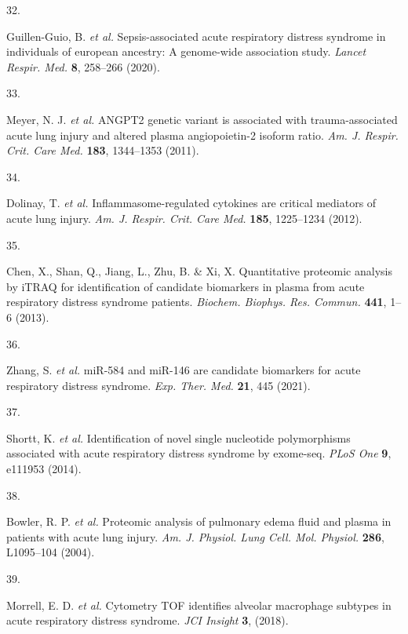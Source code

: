 \documentclass[
  11,
  a4paper,
]{article}
\newlength{\cslhangindent}
\newlength{\csllabelwidth}
\newlength{\cslentryspacingunit} %
\newenvironment{CSLReferences}[2] %
 {%
  \setlength{\parindent}{0pt}
  \ifodd #1
  \let\oldpar\par
  \def\par{\hangindent=\cslhangindent\oldpar}
  \fi
  \setlength{\parskip}{#2\cslentryspacingunit}
 }%
 {}
\newcommand{\CSLLeftMargin}[1]{\parbox[t]{\csllabelwidth}{#1}}
\newcommand{\CSLRightInline}[1]{\parbox[t]{\linewidth - \csllabelwidth}{#1}\break}
\begin{document}
\begin{CSLReferences}{0}{0}
\leavevmode{}%
\CSLLeftMargin{32. }%
\CSLRightInline{Guillen-Guio, B. \emph{et al.} Sepsis-associated acute
respiratory distress syndrome in individuals of european ancestry: A
genome-wide association study. \emph{Lancet Respir. Med.} \textbf{8},
258--266 (2020).}

\leavevmode{}%
\CSLLeftMargin{33. }%
\CSLRightInline{Meyer, N. J. \emph{et al.} {ANGPT2} genetic variant is
associated with trauma-associated acute lung injury and altered plasma
angiopoietin-2 isoform ratio. \emph{Am. J. Respir. Crit. Care Med.}
\textbf{183}, 1344--1353 (2011).}

\leavevmode{}%
\CSLLeftMargin{34. }%
\CSLRightInline{Dolinay, T. \emph{et al.} Inflammasome-regulated
cytokines are critical mediators of acute lung injury. \emph{Am. J.
Respir. Crit. Care Med.} \textbf{185}, 1225--1234 (2012).}

\leavevmode{}%
\CSLLeftMargin{35. }%
\CSLRightInline{Chen, X., Shan, Q., Jiang, L., Zhu, B. \& Xi, X.
Quantitative proteomic analysis by {iTRAQ} for identification of
candidate biomarkers in plasma from acute respiratory distress syndrome
patients. \emph{Biochem. Biophys. Res. Commun.} \textbf{441}, 1--6
(2013).}

\leavevmode{}%
\CSLLeftMargin{36. }%
\CSLRightInline{Zhang, S. \emph{et al.} miR-584 and miR-146 are
candidate biomarkers for acute respiratory distress syndrome. \emph{Exp.
Ther. Med.} \textbf{21}, 445 (2021).}

\leavevmode{}%
\CSLLeftMargin{37. }%
\CSLRightInline{Shortt, K. \emph{et al.} Identification of novel single
nucleotide polymorphisms associated with acute respiratory distress
syndrome by exome-seq. \emph{PLoS One} \textbf{9}, e111953 (2014).}

\leavevmode{}%
\CSLLeftMargin{38. }%
\CSLRightInline{Bowler, R. P. \emph{et al.} Proteomic analysis of
pulmonary edema fluid and plasma in patients with acute lung injury.
\emph{Am. J. Physiol. Lung Cell. Mol. Physiol.} \textbf{286}, L1095--104
(2004).}

\leavevmode{}%
\CSLLeftMargin{39. }%
\CSLRightInline{Morrell, E. D. \emph{et al.} Cytometry {TOF} identifies
alveolar macrophage subtypes in acute respiratory distress syndrome.
\emph{JCI Insight} \textbf{3}, (2018).}

\end{CSLReferences}
\end{document}
